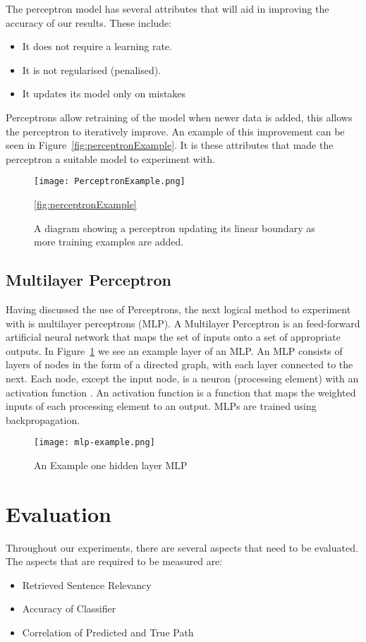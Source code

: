 \documentclass[bsc,frontabs,twoside,singlespacing,parskip,deptreport]{infthesis}     %
\begin{document}
The perceptron model has several attributes that will aid in improving the accuracy of our results.
These include:
\begin{itemize}
\item It does not require a learning rate.
\item It is not regularised (penalised).
\item It updates its model only on mistakes
\end{itemize}

Perceptrons allow retraining of the model when newer data is added, this allows the perceptron to
iteratively improve. An example of this improvement can be seen in Figure~\ref{fig:perceptronExample}.
It is these attributes that made the perceptron a suitable model to experiment with.
\begin{figure}[ht]
  \centering
  \texttt{[image: PerceptronExample.png]}
  \caption{A diagram showing a perceptron updating its linear boundary as more training examples are added. }
  \ref{fig:perceptronExample}
\end{figure}

\subsection{Multilayer Perceptron}
Having discussed the use of Perceptrons, the next logical method to experiment with is multilayer perceptrons (MLP).
A Multilayer Perceptron is an feed-forward artificial neural network that maps the set of inputs
onto a set of appropriate outputs.
In Figure~\ref{fig:mlp} we see an example layer of an MLP.
An MLP consists of layers of  nodes in the form of a directed graph, with each layer connected to the next.
Each node, except the input node, is a neuron (processing element) with an activation function \cite{}.%
An activation function is a function that maps the weighted inputs of each processing element to an output.
MLPs are trained using backpropagation.

\begin{figure}
  \centering
  \texttt{[image: mlp-example.png]}
  \caption{An Example one hidden layer MLP \cite{scikit-learn}}
  \label{fig:mlp}
\end{figure}

\section{Evaluation}
Throughout our experiments, there are several aspects that need to be evaluated.
The aspects that are required to be measured are:
\begin{itemize}
  \item Retrieved Sentence Relevancy
  \item Accuracy of Classifier
  \item Correlation of Predicted and True Path
\end{itemize}
\end{document}
